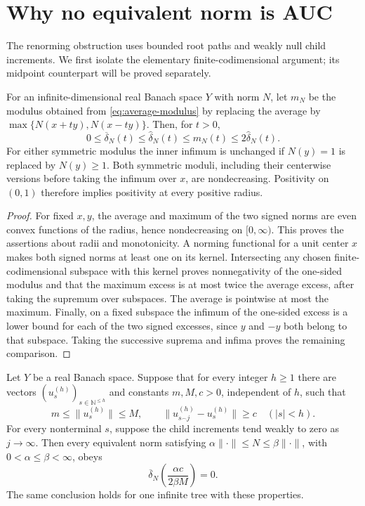 \section{Why no equivalent norm is AUC}\label{sec:no-auc}

The renorming obstruction uses bounded root paths and weakly null
child increments. We first isolate the elementary finite-codimensional
argument; its midpoint counterpart will be proved separately.

\begin{lemma}\label{lem:modulus-conventions}
For an infinite-dimensional real Banach space $Y$ with norm $N$, let
$m_N$ be the modulus obtained from \eqref{eq:average-modulus} by replacing
the average by $\max\{N(x+ty),N(x-ty)\}$. Then, for $t>0$,
\[
 0\le\overline\delta_N(t)\le\widehat\delta_N(t)
 \le m_N(t)\le2\widehat\delta_N(t).
\]
For either symmetric modulus the inner infimum is unchanged if
$N(y)=1$ is replaced by $N(y)\ge1$. Both symmetric moduli, including
their centerwise versions before taking the infimum over $x$, are
nondecreasing. Positivity on $(0,1)$ therefore implies positivity at
every positive radius.
\end{lemma}

\begin{proof}
For fixed $x,y$, the average and maximum of the two signed norms are
even convex functions of the radius, hence nondecreasing on $[0,\infty)$.
This proves the assertions about radii and monotonicity. A norming
functional for a unit center $x$ makes both signed norms at least one
on its kernel. Intersecting any chosen finite-codimensional subspace
with this kernel proves nonnegativity of the one-sided modulus and
that the maximum excess is at most twice the average excess, after
taking the supremum over subspaces. The average is pointwise at most
the maximum. Finally, on a fixed subspace the infimum of the one-sided
excess is a lower bound for each of the two signed excesses, since
$y$ and $-y$ both belong to that subspace. Taking the successive
suprema and infima proves the remaining comparison.
\end{proof}

\begin{lemma}\label{lem:bounded-tree}
Let $Y$ be a real Banach space. Suppose that for every integer $h\ge1$
there are vectors $(u_s^{(h)})_{s\in\mathbb N^{\le h}}$ and constants
$m,M,c>0$, independent of $h$, such that
\[
 m\le\|u_s^{(h)}\|\le M,
 \qquad
 \|u_{s^\frown j}^{(h)}-u_s^{(h)}\|\ge c\quad(|s|<h).
\]
For every nonterminal $s$, suppose the child increments tend weakly
to zero as $j\to\infty$. Then every equivalent norm satisfying
$\alpha\|\cdot\|\le N\le\beta\|\cdot\|$, with
$0<\alpha\le\beta<\infty$, obeys
\begin{equation}\label{eq:bounded-tree-scale}
 \overline\delta_N\!\left(\frac{\alpha c}{2\beta M}\right)=0.
\end{equation}
The same conclusion holds for one infinite tree with these properties.
\end{lemma}


